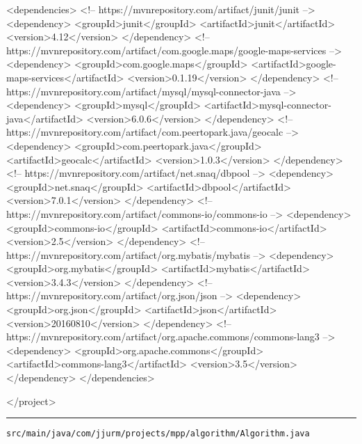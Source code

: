 \begin{xmlcode}
  <dependencies>
    <!-- https://mvnrepository.com/artifact/junit/junit -->
    <dependency>
      <groupId>junit</groupId>
      <artifactId>junit</artifactId>
      <version>4.12</version>
    </dependency>
    <!-- https://mvnrepository.com/artifact/com.google.maps/google-maps-services -->
    <dependency>
      <groupId>com.google.maps</groupId>
      <artifactId>google-maps-services</artifactId>
      <version>0.1.19</version>
    </dependency>
    <!-- https://mvnrepository.com/artifact/mysql/mysql-connector-java -->
    <dependency>
      <groupId>mysql</groupId>
      <artifactId>mysql-connector-java</artifactId>
      <version>6.0.6</version>
    </dependency>
    <!-- https://mvnrepository.com/artifact/com.peertopark.java/geocalc -->
    <dependency>
      <groupId>com.peertopark.java</groupId>
      <artifactId>geocalc</artifactId>
      <version>1.0.3</version>
    </dependency>
    <!-- https://mvnrepository.com/artifact/net.snaq/dbpool -->
    <dependency>
      <groupId>net.snaq</groupId>
      <artifactId>dbpool</artifactId>
      <version>7.0.1</version>
    </dependency>
    <!-- https://mvnrepository.com/artifact/commons-io/commons-io -->
    <dependency>
      <groupId>commons-io</groupId>
      <artifactId>commons-io</artifactId>
      <version>2.5</version>
    </dependency>
    <!-- https://mvnrepository.com/artifact/org.mybatis/mybatis -->
    <dependency>
      <groupId>org.mybatis</groupId>
      <artifactId>mybatis</artifactId>
      <version>3.4.3</version>
    </dependency>
    <!-- https://mvnrepository.com/artifact/org.json/json -->
    <dependency>
      <groupId>org.json</groupId>
      <artifactId>json</artifactId>
      <version>20160810</version>
    </dependency>
    <!-- https://mvnrepository.com/artifact/org.apache.commons/commons-lang3 -->
    <dependency>
      <groupId>org.apache.commons</groupId>
      <artifactId>commons-lang3</artifactId>
      <version>3.5</version>
    </dependency>
  </dependencies>

</project>\end{xmlcode}

\noindent\rule{\textwidth}{0.4pt}

\nointerlineskip
\texttt{src/main/java/com/jjurm/projects/mpp/algorithm/Algorithm.java}

